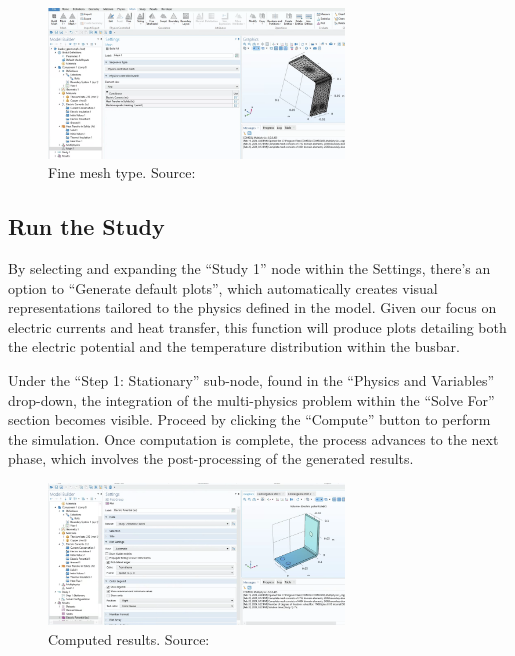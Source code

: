 \begin{figure}[H]
  \centering
  \includegraphics[width=0.7\textwidth]{Chapters/Figures/Chapter 3 Figures/Fine Mesh.png}
  \caption{Fine mesh type. Source: \cite{multiphysics__modeling_nodate}}
  \label{fig:Fine mesh type.}
\end{figure}

\subsection{Run the Study}
By selecting and expanding the ``Study 1'' node within the Settings, there's an option to ``Generate default plots'', which automatically creates visual representations tailored to the physics defined in the model. Given our focus on electric currents and heat transfer, this function will produce plots detailing both the electric potential and the temperature distribution within the busbar.

Under the ``Step 1: Stationary'' sub-node, found in the ``Physics and Variables'' drop-down, the integration of the multi-physics problem within the ``Solve For'' section becomes visible. Proceed by clicking the ``Compute'' button to perform the simulation. Once computation is complete, the process advances to the next phase, which involves the post-processing of the generated results.

\begin{figure}[H]
  \centering
  \includegraphics[width=0.7\textwidth]{Chapters/Figures/Chapter 3 Figures/Computed Results.png}
  \caption{Computed results. Source: \cite{multiphysics__modeling_nodate}}
  \label{fig:computed results}
\end{figure}

